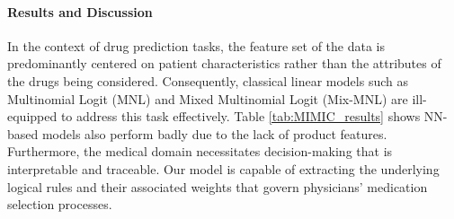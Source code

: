 \documentclass{article} %
\begin{document}
\paragraph{Results and Discussion} In the context of drug prediction tasks, the feature set of the data is predominantly centered on patient characteristics rather than the attributes of the drugs being considered. Consequently, classical linear models such as Multinomial Logit (MNL) and Mixed Multinomial Logit (Mix-MNL) are ill-equipped to address this task effectively. Table \ref{tab:MIMIC_results} shows NN-based models also perform badly due to the lack of product features. Furthermore, the medical domain necessitates decision-making that is interpretable and traceable. Our model is capable of extracting the underlying logical rules and their associated weights that govern physicians’ medication selection processes.
\end{document}
